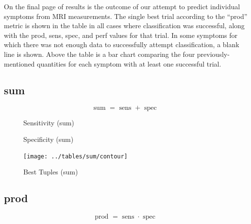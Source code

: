 \documentclass[10pt]{article}
\newcommand{\sens}{\mbox{ sens }}
\newcommand{\spec}{\mbox{ spec }}
\begin{document}
On the final page of results is the outcome of our attempt to predict individual symptoms from MRI measurements. The single best trial according to the ``prod'' metric is shown in the table in all cases where classification was successful, along with the prod, sens, spec, and perf values for that trial. In some symptoms for which there was not enough data to successfully attempt classification, a blank line is shown. Above the table is a bar chart comparing the four previously-mentioned quantities for each symptom with at least one successful trial.

\pagebreak
\subsection{sum}
\vspace{1em}
\begin{equation}
	\mbox{sum } = \sens + \spec
\end{equation}
\vspace{1em}

\begin{multicols}{2}
	\begin{figure}[H]
		\center
		
		\caption{Sensitivity (sum)}
	\end{figure}

	\begin{figure}[H]
		\center
		
		\caption{Specificity (sum)}
	\end{figure}
	
	\begin{figure}[H]
		\texttt{[image: ../tables/sum/contour]}
	\end{figure}
\end{multicols}

\vspace{2em}

\begin{figure}[H]
	\center
	
	\caption{Best Tuples (sum)}
\end{figure}

\pagebreak
\subsection{prod}
\vspace{1em}
\begin{equation}
	\mbox{prod } = \sens\cdot\spec
\end{equation}
\vspace{1em}
\end{document}
